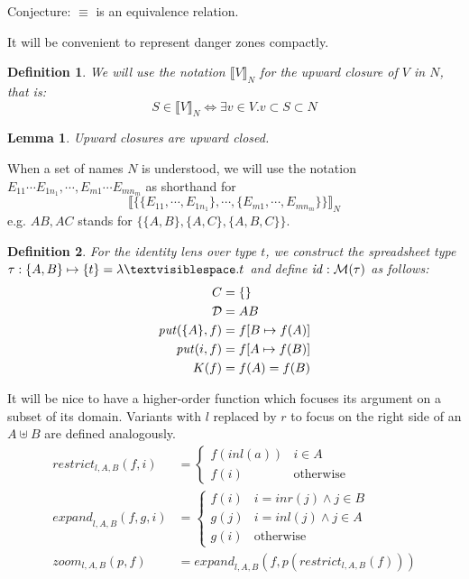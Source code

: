 \documentclass{article}
\newtheorem{lemma}{Lemma}
\newtheorem{definition}{Definition}
\begin{document}
Conjecture: $\equiv$ is an equivalence relation.

It will be convenient to represent danger zones compactly.

\newcommand{\upclose}[2]{\llbracket #1 \rrbracket_{#2}}
\begin{definition}
    We will use the notation $\upclose VN$ for \emph{the upward closure of
    $V$ in $N$}, that is:
    \[S \in \upclose VN \iff \exists v \in V. v \subset S \subset N\]
\end{definition}

\begin{lemma}
    Upward closures are upward closed.
\end{lemma}

When a set of names $N$ is understood, we will use the notation
$E_{11}\cdots E_{1n_1},\cdots,E_{m1}\cdots E_{mn_m}$ as shorthand for
\[\upclose{\{\{E_{11},\cdots,E_{1n_1}\},\cdots,\{E_{m1},\cdots,E_{mn_m}\}\}}N\]
e.g. $AB,AC$ stands for $\{\{A,B\},\{A,C\},\{A,B,C\}\}$.

\newcommand{\id}{\mathit{id}}
\begin{definition}
    For the identity lens over type $t$, we construct the spreadsheet type
    $\tau:\{A,B\} \mapsto \{t\}=\lambda\textvisiblespace. t$ and define $\id
    : \mlens\tau$ as follows:
    \begin{align*}
        C &= \{\} \\
        \mathcal D &= AB \\
        \mathit{put}(\{A\},f) &= f[B \mapsto f(A)] \\
        \mathit{put}(i,f) &= f[A \mapsto f(B)] \\
        K(f) &= f(A) = f(B)
    \end{align*}
\end{definition}

\newcommand{\cond}[1]{\left\{\begin{array}{ll}#1\end{array}\right.}
\newcommand{\inl}{\mathit{inl}}
\newcommand{\inr}{\mathit{inr}}
\newcommand{\restrict}{\mathit{restrict}}
\newcommand{\expand}{\mathit{expand}}
\newcommand{\zoom}{\mathit{zoom}}
It will be nice to have a higher-order function which focuses its argument
on a subset of its domain. Variants with $l$ replaced by $r$ to focus on the
right side of an $A \uplus B$ are defined analogously.
\begin{align*}
    \restrict_{l,A,B}(f,i) &= \cond{
        f(\inl(a)) & i \in A \\
        f(i) & \mbox{otherwise}
        } \\
    \expand_{l,A,B}(f,g,i) &= \cond{
        f(i) & i = \inr(j) \land j \in B \\
        g(j) & i = \inl(j) \land j \in A \\
        g(i) & \mbox{otherwise}
        } \\
    \zoom_{l,A,B}(p,f) &= \expand_{l,A,B}(f,p(\restrict_{l,A,B}(f)))
\end{align*}
\end{document}
